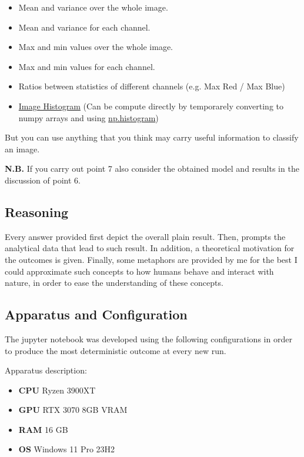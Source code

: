 \documentclass[11pt]{scrartcl}
\begin{document}
\begin{enumerate}
\begin{itemize}
	\item Mean and variance over the whole image.
	\item Mean and variance for each channel.
	\item Max and min values over the whole image.
	\item Max and min values for each channel.
	\item Ratios between statistics of different channels (e.g. Max Red / Max Blue)
	\item \href{https://en.wikipedia.org/wiki/Image_histogram}{Image Histogram} 
	(Can be compute directly by temporarely converting to numpy arrays and using 
	\href{https://numpy.org/doc/stable/reference/generated/numpy.histogram.html}{np.histogram})
\end{itemize}

But you can use anything that you think may carry useful information to classify an image.

\textbf{N.B.} 
If you carry out point 7 also consider the obtained model 
and results in the discussion of point 6.
\end{enumerate}


\subsection*{Reasoning}

Every answer provided first depict the overall plain result.
Then, prompts the analytical data that lead to such result.
In addition, a theoretical motivation for the outcomes is given.
Finally, some metaphors are provided by me for the best I could approximate such concepts 
to how humans behave and interact with nature, 
in order to ease the understanding of these concepts. 


\subsection*{Apparatus and Configuration}

The jupyter notebook was developed using the following configurations in order to 
produce the most deterministic outcome at every new run.

Apparatus description:

\begin{itemize}
	\item \textbf{CPU} Ryzen 3900XT
	\item \textbf{GPU} RTX 3070 8GB VRAM
	\item \textbf{RAM} 16 GB 
	\item \textbf{OS} Windows 11 Pro 23H2
\end{itemize}
\end{document}
